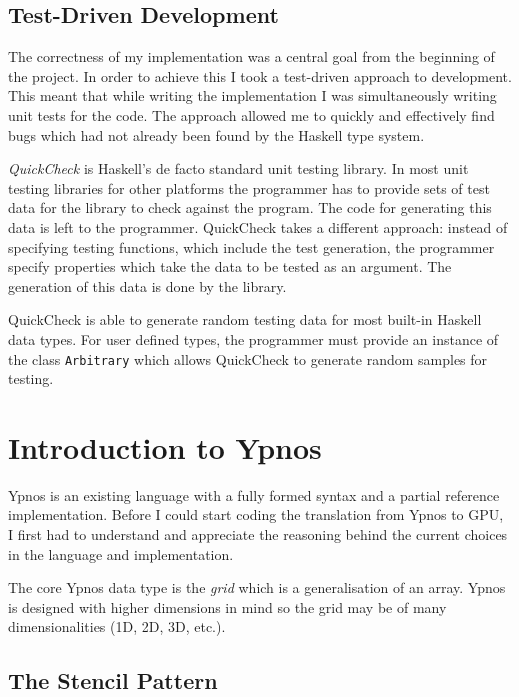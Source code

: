 \documentclass[12pt,a4paper,twoside]{scrbook}
\begin{document}
\subsection{Test-Driven Development}
\label{sec:tdd}

The correctness of my implementation was a central goal from the beginning of
the project. In order to achieve this I took a test-driven approach to
development. This meant that while writing the implementation I was
simultaneously writing unit tests for the code.  The approach allowed me to
quickly and effectively find bugs which had not already been found by the
Haskell type system.

\emph{QuickCheck} is Haskell's de facto standard unit testing
library\cite{claessen2011}. In most unit testing libraries for other platforms
the programmer has to provide sets of test data for the library to check against
the program.  The code for generating this data is left to the
programmer. QuickCheck takes a different approach: instead of specifying testing
functions, which include the test generation, the programmer specify properties
which take the data to be tested as an argument. The generation of this data is
done by the library.

QuickCheck is able to generate random testing data for most built-in Haskell
data types. For user defined types, the programmer must provide an instance of
the class \texttt{Arbitrary} which allows QuickCheck to generate random samples
for testing.


\section{Introduction to Ypnos}

Ypnos is an existing language with a fully formed syntax and a partial reference
implementation. Before I could start coding the translation from Ypnos to GPU, I
first had to understand and appreciate the reasoning behind the current choices
in the language and implementation.

The core Ypnos data type is the \emph{grid} which is a generalisation of an
array. Ypnos is designed with higher dimensions in mind so the grid may be of
many dimensionalities (1D, 2D, 3D, etc.).

\subsection{The Stencil Pattern} 
\end{document}
